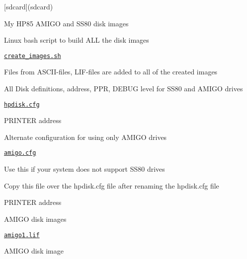 \begin{DoxyItemize}
\item \mbox{[}sdcard\mbox{]}(sdcard)
\begin{DoxyItemize}
\item My H\+P85 A\+M\+I\+GO and S\+S80 disk images
\begin{DoxyItemize}
\item Linux bash script to build A\+LL the disk images
\begin{DoxyItemize}
\item \href{sdcard/create_images.sh}{\tt create\+\_\+images.\+sh}
\begin{DoxyItemize}
\item Files from A\+S\+C\+I\+I-\/files, L\+I\+F-\/files are added to all of the created images
\end{DoxyItemize}
\end{DoxyItemize}
\item All Disk definitions, address, P\+PR, D\+E\+B\+UG level for S\+S80 and A\+M\+I\+GO drives
\begin{DoxyItemize}
\item \href{sdcard/hpdisk.cfg}{\tt hpdisk.\+cfg}
\begin{DoxyItemize}
\item P\+R\+I\+N\+T\+ER address
\end{DoxyItemize}
\end{DoxyItemize}
\item Alternate configuration for using only A\+M\+I\+GO drives
\begin{DoxyItemize}
\item \href{sdcard/amigo.cfg}{\tt amigo.\+cfg}
\begin{DoxyItemize}
\item Use this if your system does not support S\+S80 drives
\begin{DoxyItemize}
\item Copy this file over the hpdisk.\+cfg file after renaming the hpdisk.\+cfg file
\end{DoxyItemize}
\item P\+R\+I\+N\+T\+ER address
\end{DoxyItemize}
\end{DoxyItemize}
\item A\+M\+I\+GO disk images
\begin{DoxyItemize}
\item \href{sdcard/amigo1.lif}{\tt amigo1.\+lif}
\begin{DoxyItemize}
\item A\+M\+I\+GO disk image

\end{DoxyItemize}
\end{DoxyItemize}
\end{DoxyItemize}
\end{DoxyItemize}
\end{DoxyItemize}
